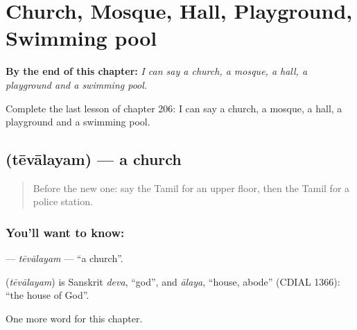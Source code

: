 
\chapter{Church, Mosque, Hall, Playground, Swimming pool}
\label{ch:ta-church-mosque-hall-playground-swimming-pool}

\begin{chapteropening}
\textbf{By the end of this chapter:} \emph{I can say a church, a mosque, a hall, a playground and a swimming pool.}

Complete the last lesson of chapter 206: I can say a church, a mosque, a hall, a playground and a swimming pool.
\end{chapteropening}

\section[\texorpdfstring{\ta{தேவாலயம்} (tēvālayam)}{தேவாலயம் (tēvālayam)}]{ (tēvālayam) — a church}

\label{lesson:TA-C206-tevalayam}



\begin{quote}
Before the new one: say the Tamil for an upper floor, then the Tamil for a police station.
\end{quote}

\subsection*{You'll want to know: }
\textbf{} — \emph{tēvālayam} — \textquotedblleft{}a church\textquotedblright{}.

\begin{cousinweb}
\textbf{} (\emph{tēvālayam}) is Sanskrit \emph{deva}, \textquotedblleft{}god\textquotedblright{}, and \emph{ālaya}, \textquotedblleft{}house, abode\textquotedblright{} (CDIAL 1366): \textquotedblleft{}the house of God\textquotedblright{}.
\end{cousinweb}

\begin{grammarlens}[title={What you've built}]
One more word for this chapter.
\end{grammarlens}

